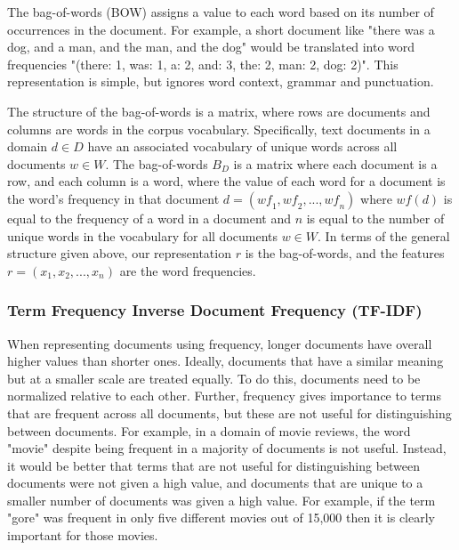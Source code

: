 
The bag-of-words (BOW)  assigns a value to each word based on its number of occurrences in the document. For example, a short document like "there was a dog, and a man, and the man, and the dog" would be translated into word frequencies "(there: 1, was: 1, a: 2, and: 3, the: 2, man: 2, dog: 2)". This representation is simple,  but ignores word context, grammar and punctuation.  %


The  structure of the bag-of-words is  a matrix, where rows are documents and columns are words in the corpus vocabulary. Specifically,  text documents in a domain $d \in D$ have an associated vocabulary of unique words across all documents $w \in W$. The bag-of-words $B_D$ is a matrix where each document is a row, and each column is a word, where the value of each word for a document is the word's frequency in that document $d = (\textit{wf}_1, \textit{wf}_2, ..., \textit{wf}_n)$ where ${wf}(d)$ is equal to the frequency of a word in a document and $n$ is equal to the number of unique words  in the vocabulary for all documents $w \in W$. In terms of the general structure given above, our representation $r$  is the bag-of-words, and the features $r = (x_1, x_2, ..., x_n)$ are the word frequencies.


\subsubsection{Term Frequency Inverse Document Frequency (TF-IDF)}

When representing documents using  frequency, longer documents have overall higher values than shorter ones. Ideally, documents that have a similar meaning but at a smaller scale are treated equally. To do this, documents need to be normalized relative to each other. Further, frequency gives  importance to terms that are frequent across all documents, but these are not useful for distinguishing between documents. For example, in a domain of movie reviews, the word "movie" despite being frequent in a majority of documents is not useful. Instead, it would be better that terms that are not useful for distinguishing between documents were not given a high value, and documents that are unique to a smaller number of documents was given a high value. For example, if the term "gore" was frequent in only five different movies out of 15,000 then it is clearly important for those movies. 

